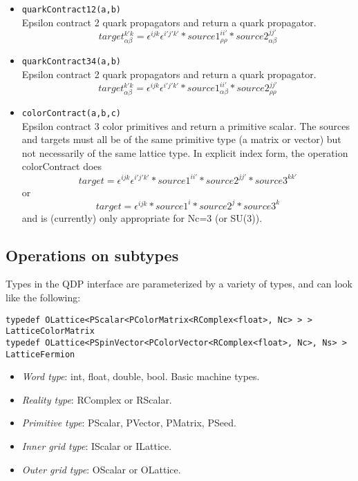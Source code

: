 \documentclass[12pt,letterpaper]{article}
\begin{document}
\begin{itemize}
\item
\verb|quarkContract12(a,b)|\\
Epsilon contract 2 quark propagators and return a quark propagator.
$$target^{k' k}_{\alpha\beta} =
    \epsilon^{i j k}\epsilon^{i' j' k'}*source1^{i i'}_{\rho\rho}*source2^{j j'}_{\alpha\beta}$$

\item
\verb|quarkContract34(a,b)|\\
Epsilon contract 2 quark propagators and return a quark propagator.
$$target^{k' k}_{\alpha\beta} =
    \epsilon^{i j k}\epsilon^{i' j' k'}*source1^{i i'}_{\alpha\beta}*source2^{j j'}_{\rho\rho}$$

\item
\verb|colorContract(a,b,c)|\\
Epsilon contract 3 color primitives and return a primitive scalar.
The sources and targets must all be of the same primitive type (a matrix or vector)
but not necessarily of the same lattice type. In
explicit index form, the operation  colorContract does
$$
target =
  \epsilon^{i j k}\epsilon^{i' j' k'}* source1^{i i'}* source2^{j j'}*source3^{k k'}
$$
or
$$
target =
 \epsilon^{i j k}* source1^{i}* source2^{j}*source3^{k}
$$
and is (currently) only appropriate for Nc=3  (or SU(3)).

\end{itemize}


\bigskip

\subsection{Operations on subtypes}

Types in the QDP interface are parameterized by a variety of types, and
can look like the following:

\begin{small}
\begin{verbatim}
typedef OLattice<PScalar<PColorMatrix<RComplex<float>, Nc> > > LatticeColorMatrix
typedef OLattice<PSpinVector<PColorVector<RComplex<float>, Nc>, Ns> > LatticeFermion
\end{verbatim}
\end{small}

\begin{itemize}
\item {\em Word type}: 
  int, float, double, bool. Basic machine types.
\item {\em Reality type}: 
  RComplex or RScalar. 
\item {\em Primitive type}: 
  PScalar, PVector, PMatrix, PSeed. 
\item {\em Inner grid type}: 
  IScalar or ILattice. 
\item {\em Outer grid type}:
  OScalar or OLattice. 
\end{itemize}
\end{document}
